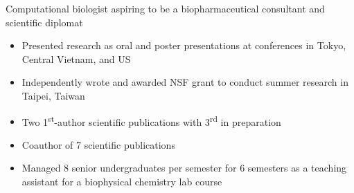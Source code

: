 

\begin{cventries}
\vspace{-4.0mm}

  \cventry
    {} %
    {} %
    {} %
    {} %
    {
      \begin{cvitems} %
        \item {Computational biologist aspiring to be a biopharmaceutical consultant and scientific diplomat}
        \begin{itemize}
       	 	\item Presented research as oral and poster presentations at conferences in Tokyo, Central Vietnam, and US  
       	 	\item Independently wrote and awarded NSF grant to conduct summer research in Taipei, Taiwan
         	\item Two 1\textsuperscript{st}-author scientific publications with 3\textsuperscript{rd} in preparation
         	\item Coauthor of 7 scientific publications
         	\item Managed 8 senior undergraduates per semester for 6 semesters as a teaching assistant for a biophysical chemistry lab course
        \end{itemize}
      \end{cvitems}
    }
\vspace{-4.0mm}
\end{cventries}

